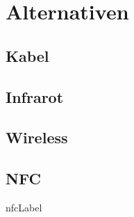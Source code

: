 \chapter{Alternativen}
\label{ch:alt}

\section{Kabel}

\section{Infrarot}

\section{Wireless}

\section{NFC}
\gls{nfcLabel}

